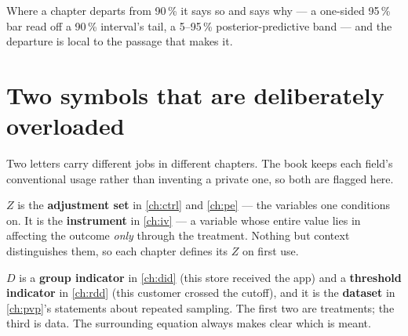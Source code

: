 Where a chapter departs from 90\,\% it says so and says why --- a one-sided 95\,\% bar read off a
90\,\% interval's tail, a 5--95\,\% posterior-predictive band --- and the departure is local to the
passage that makes it.

\section*{Two symbols that are deliberately overloaded}

Two letters carry different jobs in different chapters. The book keeps each field's conventional
usage rather than inventing a private one, so both are flagged here.

$Z$ is the \textbf{adjustment set} in \cref{ch:ctrl} and \cref{ch:pe} --- the variables one
conditions on. It is the \textbf{instrument} in \cref{ch:iv} --- a variable whose entire value lies
in affecting the outcome \emph{only} through the treatment. Nothing but context distinguishes them,
so each chapter defines its $Z$ on first use.

$D$ is a \textbf{group indicator} in \cref{ch:did} (this store received the app) and a
\textbf{threshold indicator} in \cref{ch:rdd} (this customer crossed the cutoff), and it is the
\textbf{dataset} in \cref{ch:pvp}'s statements about repeated sampling. The first two are
treatments; the third is data. The surrounding equation always makes clear which is meant.
